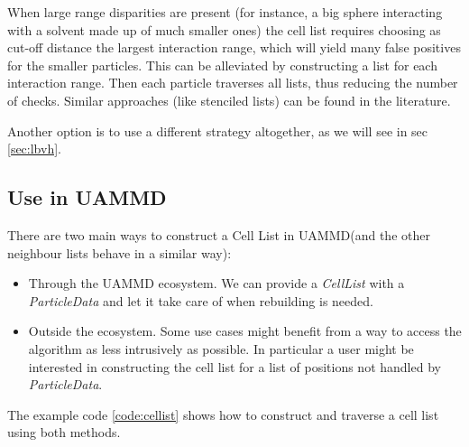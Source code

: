 \documentclass[ twoside,openright,titlepage,numbers=noenddot,%
headinclude,footinclude,cleardoublepage=empty,abstract=on,
BCOR=5mm,paper=b5,fontsize=11pt, dvipsnames
]{scrreprt}
\newcommand{\uammd}{\gls{UAMMD}\xspace}
\begin{document}
When large range disparities are present (for instance, a big sphere interacting with a solvent made up of much smaller ones) the cell list requires choosing as cut-off distance the largest interaction range, which will yield many false positives for the smaller particles. This can be alleviated by constructing a list for each interaction range. Then each particle traverses all lists, thus reducing the number of checks. Similar approaches (like stenciled lists) can be found in the literature\cite{Howard2016}.

Another option is to use a different strategy altogether, as we will see in sec \ref{sec:lbvh}.
\subsection*{Use in UAMMD}
There are two main ways to construct a Cell List in \uammd (and the other neighbour lists behave in a similar way):
\begin{itemize}
\item Through the \uammd ecosystem.
  We can provide a \emph{CellList} with a \emph{ParticleData} and let it take care of when rebuilding is needed.
\item Outside the ecosystem.
  Some use cases might benefit from a way to access the algorithm as less intrusively as possible. In particular a user might be interested in constructing the cell list for a list of positions not handled by \emph{ParticleData}.
\end{itemize}
The example code \ref{code:cellist} shows how to construct and traverse a cell list using both methods.
\end{document}
